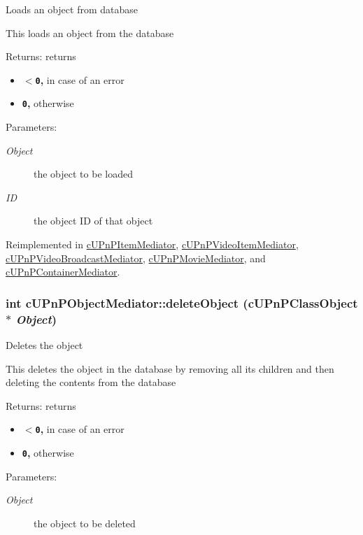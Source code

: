 Loads an object from database

This loads an object from the database

\begin{Desc}
\item[Returns:]returns\begin{itemize}
\item {\bf {\tt $<$0},} in case of an error\item {\bf {\tt 0},} otherwise \end{itemize}
\end{Desc}
\begin{Desc}
\item[Parameters:]
\begin{description}
\item[{\em Object}]the object to be loaded \item[{\em ID}]the object ID of that object \end{description}
\end{Desc}


Reimplemented in \hyperlink{classcUPnPItemMediator_1f3645ebe0a33a81d0b3f22060dc4761}{cUPnPItemMediator}, \hyperlink{classcUPnPVideoItemMediator_3f7ec1937b2b95e3ec5462470971d350}{cUPnPVideoItemMediator}, \hyperlink{classcUPnPVideoBroadcastMediator_33237e5d850c107d37be37c1646b17d7}{cUPnPVideoBroadcastMediator}, \hyperlink{classcUPnPMovieMediator_542135e9c1051b57a8f6f5ecc0c1ede3}{cUPnPMovieMediator}, and \hyperlink{classcUPnPContainerMediator_79f483b48f596047ed9549f0b036f35b}{cUPnPContainerMediator}.\hypertarget{classcUPnPObjectMediator_0d2f9d72a678002456cbdeccb2c6e5fe}{
\subsubsection[{deleteObject}]{\setlength{\rightskip}{0pt plus 5cm}int cUPnPObjectMediator::deleteObject ({\bf cUPnPClassObject} $\ast$ {\em Object})}}
\label{classcUPnPObjectMediator_0d2f9d72a678002456cbdeccb2c6e5fe}


Deletes the object

This deletes the object in the database by removing all its children and then deleting the contents from the database

\begin{Desc}
\item[Returns:]returns\begin{itemize}
\item {\bf {\tt $<$0},} in case of an error\item {\bf {\tt 0},} otherwise \end{itemize}
\end{Desc}
\begin{Desc}
\item[Parameters:]
\begin{description}
\item[{\em Object}]the object to be deleted \end{description}
\end{Desc}
 

